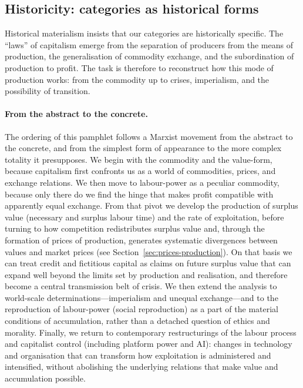\subsection{Historicity: categories as historical forms}

Historical materialism insists that our categories are historically specific. The ``laws''
of capitalism emerge from the separation of producers from the means of production, the
generalisation of commodity exchange, and the subordination of production to profit.
The task is therefore to reconstruct how this mode of production works: from the commodity
up to crises, imperialism, and the possibility of transition.\cite{EngelsAntiDuhring,Shaikh2016}

\paragraph{From the abstract to the concrete.}
The ordering of this pamphlet follows a Marxist movement from the abstract to the concrete,
and from the simplest form of appearance to the more complex totality it presupposes.
We begin with the commodity and the value-form, because capitalism first confronts us as
a world of commodities, prices, and exchange relations.\cite{Marx1867} We then move to
labour-power as a peculiar commodity, because only there do we find the hinge that makes
profit compatible with apparently equal exchange. From that pivot we develop the production
of surplus value (necessary and surplus labour time) and the rate of exploitation, before
turning to how competition redistributes surplus value and, through the formation of prices
of production, generates systematic divergences between values and market prices (see
Section~\ref{sec:prices-production}). On that basis we can treat credit and fictitious
capital as claims on future surplus value that can expand well beyond the limits set by
production and realisation, and therefore become a central transmission belt of crisis.
We then extend the analysis to world-scale determinations---imperialism and unequal exchange---and
to the reproduction of labour-power (social reproduction) as a part of the material conditions of accumulation,
rather than a detached question of ethics and morality. Finally, we return to contemporary restructurings of
the labour process and capitalist control (including platform power and AI): changes in technology
and organisation that can transform how exploitation is administered and intensified, without
abolishing the underlying relations that make value and accumulation possible.

